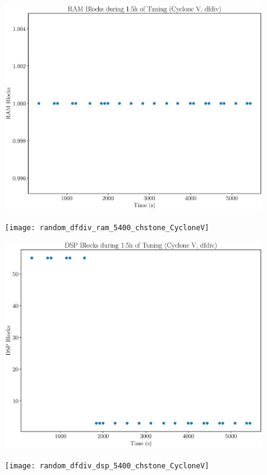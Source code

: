 \documentclass[12pt, a4paper]{article}
\begin{document}
\begin{figure}[htpb]
    \centering
    \noindent
    \begin{minipage}{.48\textwidth}
        \centering
        \includegraphics[scale=.25]{dfdiv_ram_5400_chstone_CycloneV}
    \end{minipage}%
    \hfill
    \begin{minipage}{.48\textwidth}
        \centering
        \texttt{[image: random\_dfdiv\_ram\_5400\_chstone\_CycloneV]}
    \end{minipage}%

    \begin{minipage}{.48\textwidth}
        \includegraphics[scale=.25]{dfdiv_dsp_5400_chstone_CycloneV}
    \end{minipage}%
    \hfill
    \begin{minipage}{.48\textwidth}
        \texttt{[image: random\_dfdiv\_dsp\_5400\_chstone\_CycloneV]}
    \end{minipage}%


\end{figure}
\end{document}
